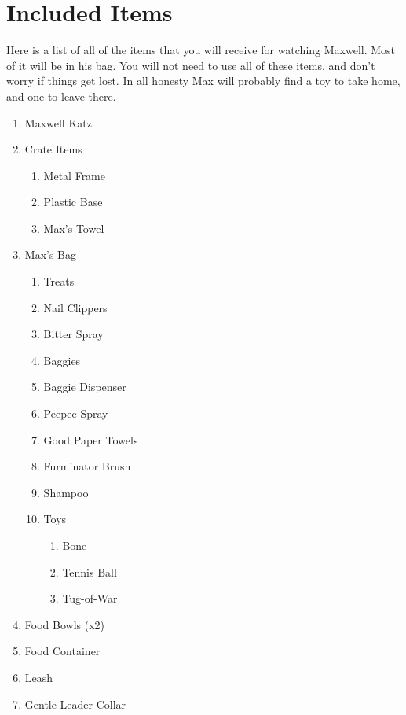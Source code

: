 \documentclass[pdftex,12pt]{article}
\begin{document}
\vspace*{\fill}

\clearpage
\newpage
\section{Included Items}

Here is a list of all of the items that you will receive for watching Maxwell.
Most of it will be in his bag. You will not need to use all of these items, and
don't worry if things get lost. In all honesty Max will probably find a toy to
take home, and one to leave there.

\begin{enumerate}\label{itm:included_items}
    \item Maxwell Katz
    \item Crate Items
        \begin{enumerate}
            \item Metal Frame
            \item Plastic Base
            \item Max's Towel
        \end{enumerate}
    \item Max's Bag
        \begin{enumerate}
            \item Treats
            \item Nail Clippers
            \item Bitter Spray
            \item Baggies
            \item Baggie Dispenser
            \item Peepee Spray
            \item Good Paper Towels
            \item Furminator Brush
            \item Shampoo
            \item Toys
                \begin{enumerate}
                    \item Bone
                    \item Tennis Ball
                    \item Tug-of-War
                \end{enumerate}
        \end{enumerate}
    \item Food Bowls (x2)
    \item Food Container
    \item Leash
    \item Gentle Leader Collar
\end{enumerate}
\end{document}
